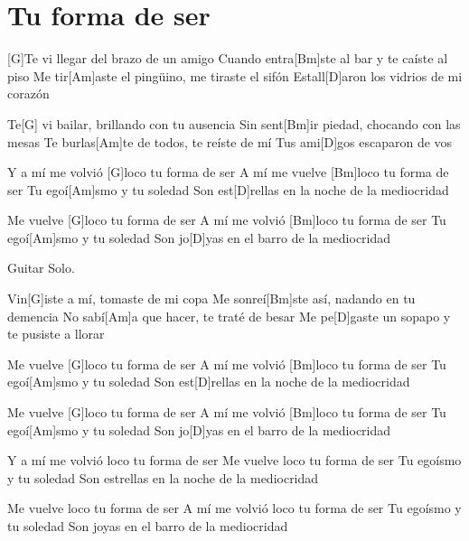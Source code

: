 \section{Tu forma de ser}

\noindent
\chordG
\chordBm
\chordAm
\chordD 

\vspace{1cm}

\begin{guitar}


\begin{multicols}{2}

	[G]Te vi llegar del brazo de un amigo
	Cuando entra[Bm]ste al bar y te caíste al piso
	Me tir[Am]aste el pingüino, me tiraste el sifón
	Estall[D]aron los vidrios de mi corazón

	Te[G] vi bailar, brillando con tu ausencia
	Sin sent[Bm]ir piedad, chocando con las mesas
	Te burlas[Am]te de todos, te reíste de mí
	Tus ami[D]gos escaparon de vos


	\vspace{0.3cm}

	Y a mí me volvió [G]loco tu forma de ser
	A mí me vuelve [Bm]loco tu forma de ser
	Tu egoí[Am]smo y tu soledad
	Son est[D]rellas en la noche de la mediocridad

	Me vuelve [G]loco tu forma de ser
	A mí me volvió [Bm]loco tu forma de ser
	Tu egoí[Am]smo y tu soledad
	Son jo[D]yas en el barro de la mediocridad


	\vspace{0.3cm}

	Guitar Solo.


	\vspace{0.3cm}

	Vin[G]iste a mí, tomaste de mi copa
	Me sonreí[Bm]ste así, nadando en tu demencia
	No sabí[Am]a que hacer, te traté de besar
	Me pe[D]gaste un sopapo y te pusiste a llorar

	\vspace{0.3cm}

	Me vuelve [G]loco tu forma de ser
	A mí me volvió [Bm]loco tu forma de ser
	Tu egoí[Am]smo y tu soledad
	Son est[D]rellas en la noche de la mediocridad

	Me vuelve [G]loco tu forma de ser
	A mí me volvió [Bm]loco tu forma de ser
	Tu egoí[Am]smo y tu soledad
	Son jo[D]yas en el barro de la mediocridad

	\vspace{0.3cm}

	Y a mí me volvió loco tu forma de ser
	Me vuelve loco tu forma de ser
	Tu egoísmo y tu soledad
	Son estrellas en la noche de la mediocridad

	Me vuelve loco tu forma de ser
	A mí me volvió loco tu forma de ser
	Tu egoísmo y tu soledad
	Son joyas en el barro de la mediocridad

\end{multicols}

\end{guitar}
